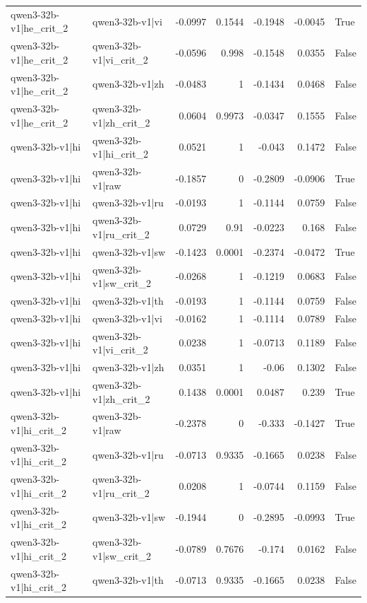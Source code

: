 \begin{table}
\begin{tabular}{l l r r r r l}
qwen3-32b-v1|he_crit_2 & qwen3-32b-v1|vi & -0.0997 & 0.1544 & -0.1948 & -0.0045 & True \\
qwen3-32b-v1|he_crit_2 & qwen3-32b-v1|vi_crit_2 & -0.0596 & 0.998 & -0.1548 & 0.0355 & False \\
qwen3-32b-v1|he_crit_2 & qwen3-32b-v1|zh & -0.0483 & 1 & -0.1434 & 0.0468 & False \\
qwen3-32b-v1|he_crit_2 & qwen3-32b-v1|zh_crit_2 & 0.0604 & 0.9973 & -0.0347 & 0.1555 & False \\
qwen3-32b-v1|hi & qwen3-32b-v1|hi_crit_2 & 0.0521 & 1 & -0.043 & 0.1472 & False \\
qwen3-32b-v1|hi & qwen3-32b-v1|raw & -0.1857 & 0 & -0.2809 & -0.0906 & True \\
qwen3-32b-v1|hi & qwen3-32b-v1|ru & -0.0193 & 1 & -0.1144 & 0.0759 & False \\
qwen3-32b-v1|hi & qwen3-32b-v1|ru_crit_2 & 0.0729 & 0.91 & -0.0223 & 0.168 & False \\
qwen3-32b-v1|hi & qwen3-32b-v1|sw & -0.1423 & 0.0001 & -0.2374 & -0.0472 & True \\
qwen3-32b-v1|hi & qwen3-32b-v1|sw_crit_2 & -0.0268 & 1 & -0.1219 & 0.0683 & False \\
qwen3-32b-v1|hi & qwen3-32b-v1|th & -0.0193 & 1 & -0.1144 & 0.0759 & False \\
qwen3-32b-v1|hi & qwen3-32b-v1|vi & -0.0162 & 1 & -0.1114 & 0.0789 & False \\
qwen3-32b-v1|hi & qwen3-32b-v1|vi_crit_2 & 0.0238 & 1 & -0.0713 & 0.1189 & False \\
qwen3-32b-v1|hi & qwen3-32b-v1|zh & 0.0351 & 1 & -0.06 & 0.1302 & False \\
qwen3-32b-v1|hi & qwen3-32b-v1|zh_crit_2 & 0.1438 & 0.0001 & 0.0487 & 0.239 & True \\
qwen3-32b-v1|hi_crit_2 & qwen3-32b-v1|raw & -0.2378 & 0 & -0.333 & -0.1427 & True \\
qwen3-32b-v1|hi_crit_2 & qwen3-32b-v1|ru & -0.0713 & 0.9335 & -0.1665 & 0.0238 & False \\
qwen3-32b-v1|hi_crit_2 & qwen3-32b-v1|ru_crit_2 & 0.0208 & 1 & -0.0744 & 0.1159 & False \\
qwen3-32b-v1|hi_crit_2 & qwen3-32b-v1|sw & -0.1944 & 0 & -0.2895 & -0.0993 & True \\
qwen3-32b-v1|hi_crit_2 & qwen3-32b-v1|sw_crit_2 & -0.0789 & 0.7676 & -0.174 & 0.0162 & False \\
qwen3-32b-v1|hi_crit_2 & qwen3-32b-v1|th & -0.0713 & 0.9335 & -0.1665 & 0.0238 & False \\

\end{tabular}
\end{table}
